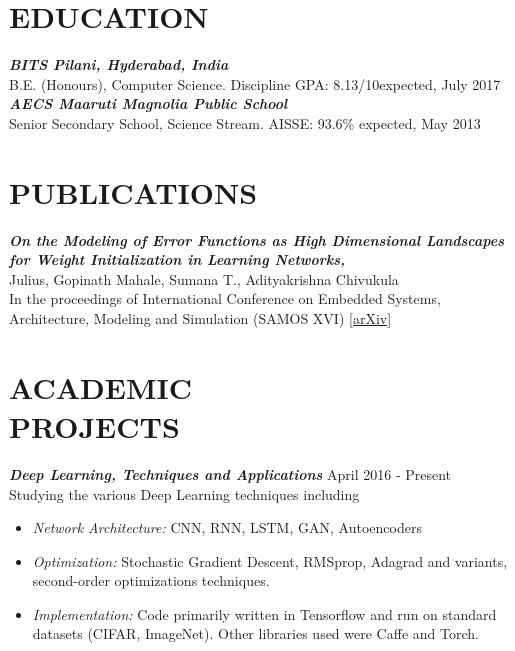 \documentclass[margin, 10pt]{res} %
\begin{document}
\begin{resume}


\section{EDUCATION}

{\sl \textbf{BITS Pilani, Hyderabad, India}}  \\
B.E. (Honours), Computer Science. Discipline GPA: 8.13/10\hfill expected, July 2017 \\ 
{\sl \textbf{AECS Maaruti Magnolia Public School}}  \\
Senior Secondary School, Science Stream. AISSE: 93.6\% \hfill expected, May 2013 \\ 
 

\section{PUBLICATIONS} 
{\sl \textbf{On the Modeling of Error Functions as High Dimensional Landscapes for Weight Initialization in Learning Networks,}} \\ Julius, Gopinath Mahale, Sumana T., Adityakrishna Chivukula\\In the proceedings of International Conference on Embedded Systems, Architecture, Modeling and Simulation (SAMOS XVI) \href{https://arxiv.org/abs/1607.06011}{[arXiv]}
 
 
\section{ACADEMIC \\ PROJECTS}

{\sl \textbf{Deep Learning, Techniques and Applications}} \hfill April 2016 - Present\\
Studying the various Deep Learning techniques including
\begin{itemize} \itemsep -2pt %
\item \textit{Network Architecture: } CNN, RNN, LSTM, GAN, Autoencoders
\item \textit{Optimization: } Stochastic Gradient Descent, RMSprop, Adagrad and variants, second-order optimizations techniques.
\item \textit{Implementation: } Code primarily written in Tensorflow and run on standard datasets (CIFAR, ImageNet). Other libraries used were Caffe and Torch.
\end{itemize}
 

\end{resume}
\end{document}
